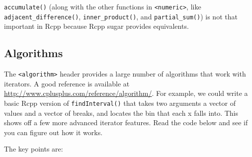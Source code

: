 \texttt{accumulate()} (along with the other functions in
\texttt{\textless{}numeric\textgreater{}}, like
\texttt{adjacent\_difference()}, \texttt{inner\_product()}, and
\texttt{partial\_sum()}) is not that important in Rcpp because Rcpp
sugar provides equivalents.

\subsection{Algorithms}

The \texttt{\textless{}algorithm\textgreater{}} header provides a large
number of algorithms that work with iterators. A good reference is
available at \url{http://www.cplusplus.com/reference/algorithm/}. For
example, we could write a basic Rcpp version of \texttt{findInterval()}
that takes two arguments a vector of values and a vector of breaks, and
locates the bin that each x falls into. This shows off a few more
advanced iterator features. Read the code below and see if you can
figure out how it works. 

\begin{Shaded}
\begin{Highlighting}[]
  



  \NormalTok{\}}

   
\NormalTok{\}}
\end{Highlighting}
\end{Shaded}

The key points are:

